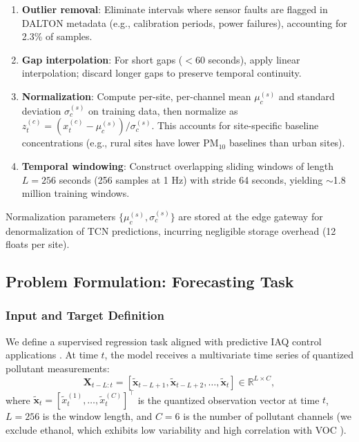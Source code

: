\begin{enumerate}
\item \textbf{Outlier removal}: Eliminate intervals where sensor faults are flagged in DALTON metadata (e.g., calibration periods, power failures), accounting for 2.3\% of samples.
\item \textbf{Gap interpolation}: For short gaps ($<$60 seconds), apply linear interpolation; discard longer gaps to preserve temporal continuity.
\item \textbf{Normalization}: Compute per-site, per-channel mean $\mu_c^{(s)}$ and standard deviation $\sigma_c^{(s)}$ on training data, then normalize as $z_t^{(c)} = (x_t^{(c)} - \mu_c^{(s)}) / \sigma_c^{(s)}$. This accounts for site-specific baseline concentrations (e.g., rural sites have lower PM$_{10}$ baselines than urban sites).
\item \textbf{Temporal windowing}: Construct overlapping sliding windows of length $L = 256$ seconds (256 samples at 1 Hz) with stride 64 seconds, yielding $\sim$1.8 million training windows.
\end{enumerate}

Normalization parameters $\{\mu_c^{(s)}, \sigma_c^{(s)}\}$ are stored at the edge gateway for denormalization of TCN predictions, incurring negligible storage overhead (12 floats per site).

\subsection{Problem Formulation: Forecasting Task}

\subsubsection{Input and Target Definition}

We define a supervised regression task aligned with predictive IAQ control applications \cite{quang2025ai}. At time $t$, the model receives a multivariate time series of quantized pollutant measurements:
\begin{equation}
\mathbf{X}_{t-L:t} = \left[ \tilde{\mathbf{x}}_{t-L+1}, \tilde{\mathbf{x}}_{t-L+2}, \ldots, \tilde{\mathbf{x}}_t \right] \in \mathbb{R}^{L \times C},
\label{eq:input_sequence}
\end{equation}
where $\tilde{\mathbf{x}}_t = [\tilde{x}_t^{(1)}, \ldots, \tilde{x}_t^{(C)}]^\top$ is the quantized observation vector at time $t$, $L = 256$ is the window length, and $C = 6$ is the number of pollutant channels (we exclude ethanol, which exhibits low variability and high correlation with VOC \cite{karmakar2024exploring}).

